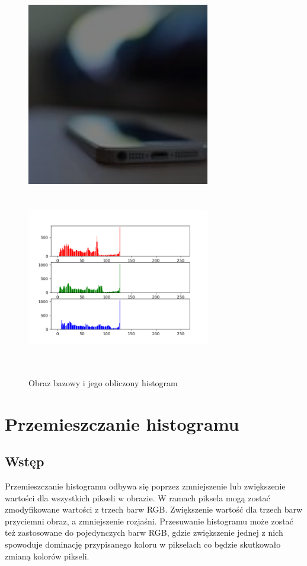 \documentclass[a4paper,12pt]{book}
\begin{document}
\begin{figure}[H]
	\caption{Obraz bazowy i jego obliczony histogram}
	\includegraphics[width=8cm, height=8cm]{phone-dark-unmodified.png}
	\includegraphics[width=8cm, height=8cm]{6-1/calculate-phone-dark.png}
\end{figure}

\section{Przemieszczanie histogramu}
\subsection*{Wstęp}
Przemieszczanie histogramu odbywa się poprzez zmniejszenie lub zwiększenie wartości dla wszystkich pikseli w obrazie. W ramach piksela mogą zostać zmodyfikowane wartości z trzech barw RGB. Zwiększenie wartość dla trzech barw przyciemni obraz, a zmniejszenie rozjaśni. Przesuwanie histogramu może zostać też zastosowane do pojedynczych barw RGB, gdzie zwiększenie jednej z nich spowoduje dominację przypisanego koloru w pikselach co będzie skutkowało zmianą kolorów pikseli. 
\end{document}
